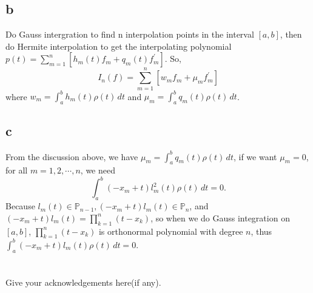 \documentclass[a4paper]{article}
\begin{document}
\subsection*{b}
Do Gauss intergration to find n interpolation points in the interval $[a,b]$, then do Hermite interpolation to get the interpolating polynomial
$p(t) = \sum_{m = 1}^{n} [h_{m}(t)f_{m} + q_{m}(t)f_{m}^{'}] $.
So,
$$I_{n}(f) = \sum_{m = 1}^{n} [w_{m}f_{m} + \mu _{m}f_{m}^{'}]$$
where $w_{m} = \int_{a}^{b} h_{m}(t)\rho(t) \,dt $ and $\mu _{m} = \int_{a}^{b} q_{m}(t)\rho(t) \,dt $.

\subsection*{c}
From the discussion above, we have $\mu _{m} = \int_{a}^{b} q_{m}(t)\rho(t) \,dt $, 
if we want $\mu_{m} = 0$, for all $m = 1,2,\cdots,n$, we need
$$\int_{a}^{b} (-x_{m} + t)l_{m}^{2}(t)\rho(t) \,dt = 0.$$
Because $l_{m}(t) \in \mathbb{P} _{n-1}, (-x_{m} + t)l_{m}(t) \in \mathbb{P} _{n}$, 
and $(-x_{m} + t)l_{m}(t) = \prod _{k=1}^{n} (t-x_{k})$, so when we do Gauss integration on $[a,b]$, 
$\prod _{k=1}^{n} (t-x_{k})$ is orthonormal polynomial with degree $n$, thus $\int_{a}^{b} (-x_{m} + t)l_{m}(t)\rho(t) \,dt = 0$.

\section*{  }
Give your acknowledgements here(if any).
\end{document}
